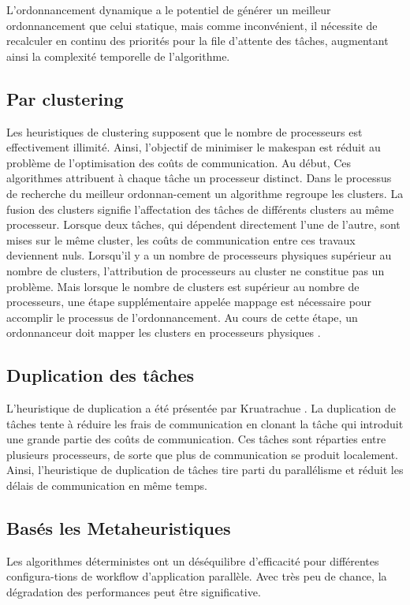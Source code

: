 L’ordonnancement dynamique a le potentiel de générer un meilleur ordonnancement que celui statique, mais comme inconvénient, il nécessite de recalculer en continu des priorités pour la file d'attente des tâches, augmentant ainsi la complexité temporelle de l'algorithme. 
%
\subsection{Par clustering}
%
Les heuristiques de clustering \cite{SIN08} supposent que le nombre de processeurs est effectivement illimité. Ainsi, l'objectif de minimiser le makespan est réduit au problème de l'optimisation des coûts de communication. Au début, Ces algorithmes attribuent à chaque tâche un processeur distinct. Dans le processus de recherche du meilleur ordonnan-cement un algorithme regroupe les clusters. La fusion des clusters signifie l'affectation des tâches de différents clusters au même processeur. Lorsque deux tâches, qui dépendent directement l'une de l'autre, sont mises sur le même cluster, les coûts de communication entre ces travaux deviennent nuls. Lorsqu'il y a un nombre de processeurs physiques supérieur au nombre de clusters, l'attribution de processeurs au cluster ne constitue pas un problème. Mais lorsque le nombre de clusters est supérieur au nombre de processeurs, une étape supplémentaire appelée mappage est nécessaire pour accomplir le processus de l'ordonnancement. Au cours de cette étape, un ordonnanceur doit mapper les clusters en processeurs physiques \cite{KA99}.
%
\subsection{Duplication des tâches}
%
L'heuristique de duplication a été présentée par Kruatrachue \cite{KRU87}. La duplication de tâches tente à réduire les frais de communication en clonant la tâche qui introduit une grande partie des coûts de communication. Ces tâches sont réparties entre plusieurs processeurs, de sorte que plus de communication se produit localement. Ainsi, l'heuristique de duplication de tâches tire parti du parallélisme et réduit les délais de communication en même temps.
%
\subsection{Basés les Metaheuristiques}
%
Les algorithmes déterministes ont un déséquilibre d'efficacité pour différentes configura-tions de workflow d'application parallèle. Avec très peu de chance, la dégradation des performances peut être significative. 

